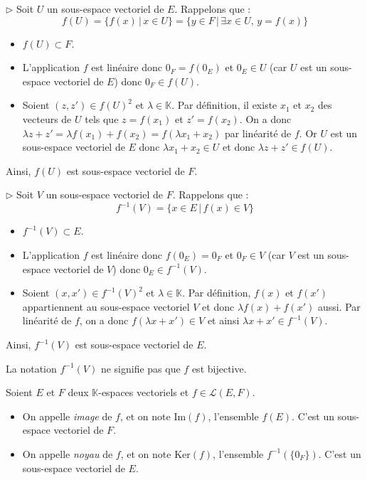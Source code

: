 \documentclass[french,11pt,twoside]{VcCours}
\renewcommand{\trou}[1]{{\color{blue}#1}}
\begin{document}
\begin{Demonstration}{}
\trou{
$\rhd$ Soit $U$ un sous-espace vectoriel de $E$. Rappelons que :
$$ f(U) = \lbrace f(x) \, \vert \, x \in U \rbrace = \lbrace y \in F \, \vert \, \exists x \in U, \, y=f(x) \rbrace$$

\begin{itemize}
\item $f(U) \subset F$.
\item L'application $f$ est linéaire donc $0_F = f(0_E)$ et $0_E \in U$ (car $U$ est un sous-espace vectoriel de $E$) donc $0_F \in f(U)$.
\item Soient $(z,z') \in f(U)^2$ et $\lambda \in \mathbb{K}$. Par définition, il existe $x_1$ et $x_2$ des vecteurs de $U$ tels que $z=f(x_1)$ et $z'=f(x_2)$. On a donc $\lambda z + z' = \lambda f(x_1)+f(x_2) = f( \lambda x_1+x_2)$ par linéarité de $f$. Or $U$ est un sous-espace vectoriel de $E$ donc $\lambda x_1+x_2 \in U$ et donc $\lambda z + z' \in f(U)$.
\end{itemize}
Ainsi, $f(U)$ est sous-espace vectoriel de $F$.

\medskip

$\rhd$ Soit $V$ un sous-espace vectoriel de $F$. Rappelons que :
$$ f^{-1}(V) = \lbrace x \in E \, \vert \, f(x) \in V \rbrace$$

\begin{itemize}
\item $f^{-1}(V) \subset E$.
\item L'application $f$ est linéaire donc $ f(0_E)=0_F$ et $0_F \in V$ (car $V$ est un sous-espace vectoriel de $V$) donc $0_E \in f^{-1}(V)$.
\item Soient $(x,x') \in f^{-1}(V)^2$ et $\lambda \in \mathbb{K}$. Par définition, $f(x)$ et $f(x')$ appartiennent au sous-espace vectoriel $V$ et donc $\lambda f(x)+f(x')$ aussi. Par linéarité de $f$, on a donc $f(\lambda x +x') \in V$ et ainsi $\lambda x+x' \in f^{-1}(V)$.
\end{itemize}
Ainsi, $f^{-1}(V)$ est sous-espace vectoriel de $E$.
}
 \end{Demonstration}
 
 \begin{Remarque}{}
	\warning{}  La notation $f^{-1}(V)$ ne signifie pas que $f$ est bijective.
 \end{Remarque}
 
 \begin{TheoremeDefinition}{} Soient $E$ et $F$ deux $\mathbb{K}$-espaces vectoriels et $f \in \mathcal{L}(E,F)$.
\begin{itemize}
 \item On appelle \emph{image} de $f$, et on note $\textrm{Im}(f)$, l'ensemble $f(E)$. C'est un sous-espace vectoriel de $F$.
 \item On appelle \emph{noyau} de $f$, et on note $\textrm{Ker}(f)$, l'ensemble $f^{-1}(\lbrace 0_F \rbrace)$. C'est un sous-espace vectoriel de $E$.
 \end{itemize}
 \end{TheoremeDefinition}
 
\end{document}
